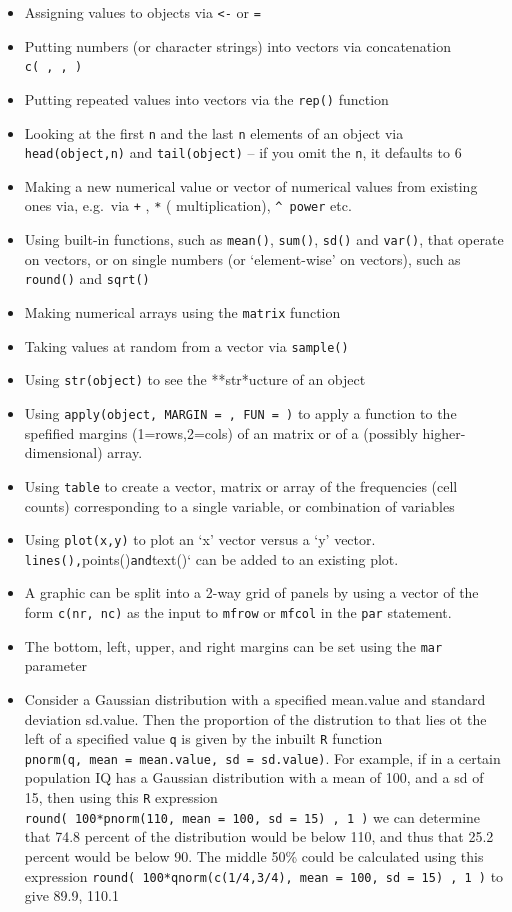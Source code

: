 \documentclass[]{book}
\begin{document}
\begin{itemize}
\item
  Assigning values to objects via \texttt{\textless{}-} or \texttt{=}
\item
  Putting numbers (or character strings) into vectors via concatenation \texttt{c(\ ,\ ,\ )}
\item
  Putting repeated values into vectors via the \texttt{rep()} function
\item
  Looking at the first \texttt{n} and the last \texttt{n} elements of an object via \texttt{head(object,n)} and \texttt{tail(object)} -- if you omit the \texttt{n}, it defaults to 6
\item
  Making a new numerical value or vector of numerical values from existing ones via, e.g.~via \texttt{+} , \texttt{*} ( multiplication), \texttt{\^{}\ power} etc.
\item
  Using built-in functions, such as \texttt{mean()}, \texttt{sum()}, \texttt{sd()} and \texttt{var()}, that operate on vectors, or on single numbers (or `element-wise' on vectors), such as \texttt{round()} and \texttt{sqrt()}
\item
  Making numerical arrays using the \texttt{matrix} function
\item
  Taking values at random from a vector via \texttt{sample()}
\item
  Using \texttt{str(object)} to see the **str*ucture of an object
\item
  Using \texttt{apply(object,\ MARGIN\ =\ ,\ FUN\ =\ )} to apply
  a function to the spefified margins (1=rows,2=cols) of an matrix or of a (possibly higher-dimensional) array.
\item
  Using \texttt{table} to create a vector, matrix or array of the frequencies (cell counts) corresponding to a single variable, or combination of variables
\item
  Using \texttt{plot(x,y)} to plot an `x' vector versus a `y' vector. \texttt{lines(),}points()\texttt{and}text()` can be added to an existing plot.
\item
  A graphic can be split into a 2-way grid of panels by using a vector of the form \texttt{c(nr,\ nc)} as the input to \texttt{mfrow} or \texttt{mfcol} in the \texttt{par} statement.
\item
  The bottom, left, upper, and right margins can be set using the \texttt{mar} parameter
\item
  Consider a Gaussian distribution with a specified mean.value and standard deviation sd.value. Then the proportion of the distrution to that lies ot the left of a specified value \texttt{q} is given by the inbuilt \texttt{R} function \texttt{pnorm(q,\ mean\ =\ mean.value,\ sd\ =\ sd.value)}. For example, if in a certain population IQ has a Gaussian distribution with a mean of 100, and a sd of 15, then using this \texttt{R} expression \texttt{round(\ 100*pnorm(110,\ mean\ =\ 100,\ sd\ =\ 15)\ ,\ 1\ )} we can determine that 74.8 percent of the distribution would be below 110, and thus that 25.2 percent would be below 90. The middle 50\% could be calculated using this expression \texttt{round(\ 100*qnorm(c(1/4,3/4),\ mean\ =\ 100,\ sd\ =\ 15)\ ,\ 1\ )} to give 89.9, 110.1
\end{itemize}
\end{document}
